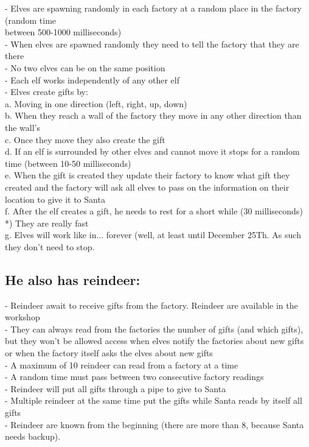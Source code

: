 \documentclass{article}
\begin{document}
- Elves are spawning randomly in each factory at a random place in the factory (random time\\
between 500-1000 milliseconds)\\
- When elves are spawned randomly they need to tell the factory that they are there\\
- No two elves can be on the same position\\
- Each elf works independently of any other elf\\
- Elves create gifts by:\\
a. Moving in one direction (left, right, up, down)\\
b. When they reach a wall of the factory they move in any other direction than the wall’s\\
c. Once they move they also create the gift\\
d. If an elf is surrounded by other elves and cannot move it stops for a random time
(between 10-50 milliseconds)\\
e. When the gift is created they update their factory to know what gift they created and
the factory will ask all elves to pass on the information on their location to give it to
Santa\\
f. After the elf creates a gift, he needs to rest for a short while (30 milliseconds)
*) They are really fast\\
g. Elves will work like in... forever (well, at least until December 25Th. As such they don't need to stop.\\
\subsection{He also has reindeer:}
- Reindeer await to receive gifts from the factory. Reindeer are available in the workshop\\
- They can always read from the factories the number of gifts (and which gifts), but they won’t be allowed access when elves notify the factories about new gifts or when the factory itself asks the elves about new gifts\\
- A maximum of 10 reindeer can read from a factory at a time\\
- A random time must pass between two consecutive factory readings\\
- Reindeer will put all gifts through a pipe to give to Santa\\
- Multiple reindeer at the same time put the gifts while Santa reads by itself all gifts\\
- Reindeer are known from the beginning (there are more than 8, because Santa needs backup).\\
\end{document}
